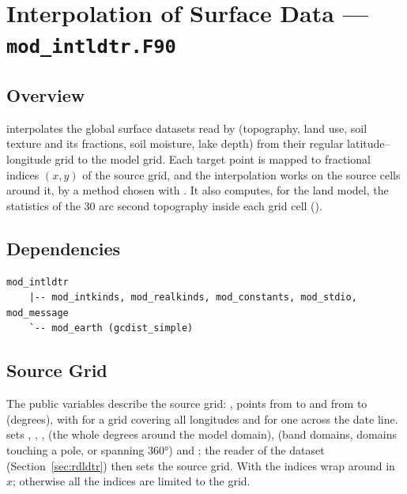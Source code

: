 \section{Interpolation of Surface Data --- \texttt{mod\_intldtr.F90}}
\label{sec:intldtr}

\subsection{Overview}

 interpolates the global surface datasets read by
 (topography, land use, soil texture and its fractions, soil
moisture, lake depth) from their regular latitude--longitude grid to the
model grid. Each target point is mapped to fractional indices $(x, y)$ of
the source grid, and the interpolation works on the source cells around
it, by a method chosen with . It also computes, for the land
model, the statistics of the 30 arc second topography inside each grid
cell ().

\subsection{Dependencies}

\begin{lstlisting}
mod_intldtr
    |-- mod_intkinds, mod_realkinds, mod_constants, mod_stdio, mod_message
    `-- mod_earth (gcdist_simple)
\end{lstlisting}

\subsection{Source Grid}

The public variables describe the source grid: ,
 points from  to  and from
 to  (degrees), with  for a grid
covering all longitudes and  for one across the date line.
 sets ,
, ,  (the whole degrees around
the model domain),  (band domains, domains touching a pole,
or spanning 360°) and ; the reader of the dataset
(Section~\ref{sec:rdldtr}) then sets the source grid. With
 the indices wrap around in $x$; otherwise all the indices
are limited to the grid.

